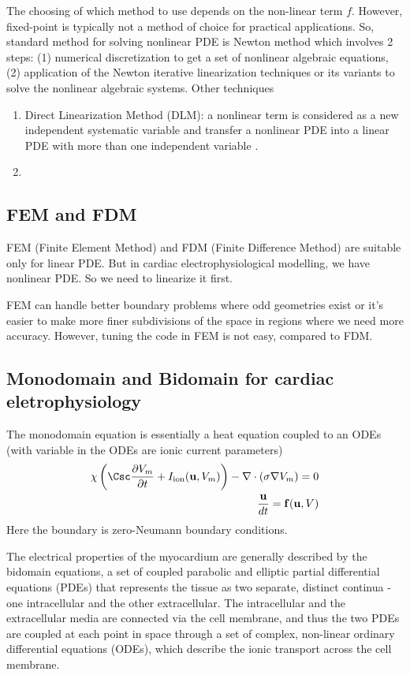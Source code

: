 The choosing of which method to use depends on the non-linear term $f$. However,
fixed-point is typically not a method of choice for practical applications. So,
standard method for solving nonlinear PDE is Newton method which involves 2
steps: (1) numerical discretization to get a set of nonlinear algebraic
equations, (2) application of the Newton iterative linearization techniques or
its variants to solve the nonlinear algebraic systems. Other techniques
\begin{enumerate}
  \item Direct Linearization Method (DLM): a nonlinear term is considered as a
  new independent systematic variable and transfer a nonlinear PDE into a linear
  PDE with more than one independent variable \citep{chen2001}.
  \item 
\end{enumerate}

\subsection{FEM and FDM}

FEM (Finite Element Method) and FDM (Finite Difference Method) are suitable only
for linear PDE. But in cardiac electrophysiological modelling, we have nonlinear
PDE. So we need to linearize it first.

FEM can handle better boundary problems where odd geometries exist or it's
easier to make more finer subdivisions of the space in regions where we need
more accuracy. However, tuning the code in FEM is not easy, compared to FDM.

\subsection{Monodomain and Bidomain for cardiac eletrophysiology}

The monodomain equation is essentially a heat equation coupled to an ODEs (with
variable in the ODEs are ionic current parameters)
\begin{equation}
\begin{split}
\chi \left( \Csc \frac{\partial V_m}{\partial t} + I_\ion (\mathbf{u}, V_m)
\right)  - \nabla \cdot (\sigma \nabla V_m) = 0 \\
\frac{\mathbf{u}}{dt} = \mathbf{f(u}, V)
\end{split}
\end{equation}
Here the boundary is zero-Neumann boundary conditions.

The electrical properties of the myocardium are generally described by the bidomain
equations, a set of coupled parabolic and elliptic partial differential
equations (PDEs) that represents the tissue as two separate, distinct continua -
one intracellular and the other extracellular.   The intracellular and the
extracellular media are connected via the cell membrane, and thus the two PDEs
are coupled at each point in space through a set of complex, non-linear ordinary
differential equations (ODEs), which describe the ionic transport across the
cell membrane.

